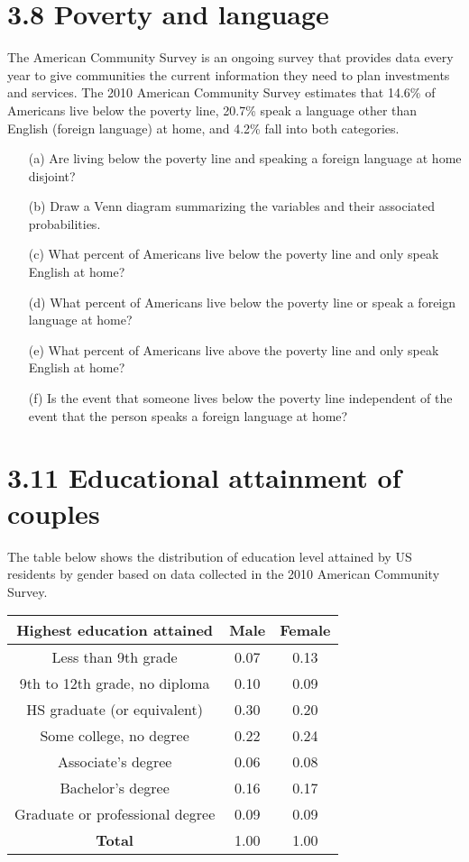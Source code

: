 \documentclass{article}
\begin{document}
\section*{3.8 Poverty and language}
The American Community Survey is an ongoing survey that provides data every year to give communities the current information they need to plan investments and services. The 2010 American Community Survey estimates that 14.6\% of Americans live below the poverty line, 20.7\% speak a language other than English (foreign language) at home, and 4.2\% fall into both categories.
\begin{enumerate}
    \item[(a)] Are living below the poverty line and speaking a foreign language at home disjoint?
    \item[(b)] Draw a Venn diagram summarizing the variables and their associated probabilities.
    \item[(c)] What percent of Americans live below the poverty line and only speak English at home?
    \item[(d)] What percent of Americans live below the poverty line or speak a foreign language at home?
    \item[(e)] What percent of Americans live above the poverty line and only speak English at home?
    \item[(f)] Is the event that someone lives below the poverty line independent of the event that the person speaks a foreign language at home?
\end{enumerate}

\section*{3.11 Educational attainment of couples}
The table below shows the distribution of education level attained by US residents by gender based on data collected in the 2010 American Community Survey. \\

\begin{table}[htbp]
\centering
\begin{tabular}{|c|c|c|}
\hline
\textbf{Highest education attained} & \textbf{Male} & \textbf{Female} \\
\hline
Less than 9th grade & 0.07 & 0.13 \\
9th to 12th grade, no diploma & 0.10 & 0.09 \\
HS graduate (or equivalent) & 0.30 & 0.20 \\
Some college, no degree & 0.22 & 0.24 \\
Associate's degree & 0.06 & 0.08 \\
Bachelor's degree & 0.16 & 0.17 \\
Graduate or professional degree & 0.09 & 0.09 \\
\hline
\textbf{Total} & 1.00 & 1.00 \\
\hline
\end{tabular}
\end{table}
\end{document}
